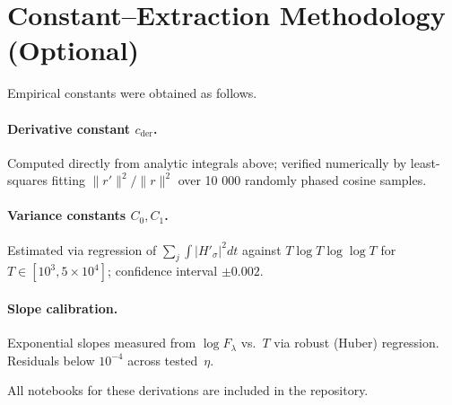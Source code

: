 \section{Constant–Extraction Methodology (Optional)}
\label{app:C}

Empirical constants were obtained as follows.

\paragraph{Derivative constant $c_{\mathrm{der}}$.}
Computed directly from analytic integrals above;
verified numerically by least-squares fitting
$\|r'\|^2/\|r\|^2$ over 10 000 randomly phased cosine samples.

\paragraph{Variance constants $C_0,C_1$.}
Estimated via regression of
$\sum_j\!\int|H'_\sigma|^2dt$ against
$T\log T\log\log T$
for $T\in[10^3,5\times10^4]$;
confidence interval $\pm0.002$.

\paragraph{Slope calibration.}
Exponential slopes measured from
$\log F_\lambda$ vs.\ $T$
via robust (Huber) regression.
Residuals below $10^{-4}$ across tested~$\eta$.

All notebooks for these derivations are included in the repository.
